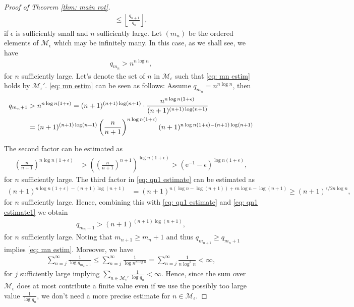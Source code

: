 \documentclass[11pt]{amsart}
\theoremstyle{definition}
\numberwithin{equation}{section}
\begin{document}
\begin{proof}[Proof of Theorem \ref{thm: main rot}]
\begin{align*}
 \leq  \left\lfloor \frac{q_{n+1}}{q_n}\right\rfloor, 
\end{align*}
if $\epsilon$ is sufficiently small and $n$ sufficiently large. 
Let $(m_n)$ be the ordered elements of $\mathcal{M}_{\epsilon}$ which may be infinitely many. In this case, as we shall see, we have
\begin{align}
 q_{m_n}> n^{n\log n},\label{eq: mn estim}
\end{align} 
for $n$ sufficiently large. Let's denote the set of $n$ in $\mathcal{M}_{\epsilon}$ such that \eqref{eq: mn estim} holds by $\mathcal{M}_{\epsilon}'$. \eqref{eq: mn estim} can be seen as follows: 
Assume $q_{m_n}=n^{n\log n}$, then 
\begin{align}
 q_{m_n+1} &> n^{n\log n(1+\epsilon)}
 = (n+1)^{(n+1)\log (n+1)}\cdot \frac{ n^{n\log n(1+\epsilon)}}{(n+1)^{(n+1)\log (n+1)}}\notag\\
 &=(n+1)^{(n+1)\log (n+1)}\left(\frac{n}{n+1}\right)^{n\log n(1+\epsilon)}
 (n+1)^{n\log n(1+\epsilon)- (n+1)\log (n+1)}\label{eq: qn1 estimate}
\end{align}

The second factor can be estimated as
\begin{align}
 \left(\frac{n}{n+1}\right)^{n\log n(1+\epsilon)}
 &>\left(\left(\frac{n}{n+1}\right)^{n+1}\right)^{\log n(1+\epsilon)}
 > \left(\mathrm{e}^{-1}-\epsilon\right)^{\log n(1+\epsilon)},\label{eq: qn1 estimate1} 
\end{align}
for $n$ sufficiently large. 
The third factor in \eqref{eq: qn1 estimate} can be estimated as 
\begin{align*}
 (n+1)^{n\log n(1+\epsilon)- (n+1)\log (n+1)}
 &=(n+1)^{n(\log n-\log (n+1))+\epsilon n\log n-\log (n+1)}
 \geq (n+1)^{\epsilon/2 n\log n}, 
\end{align*}
for $n$ sufficiently large. 
Hence, combining this with \eqref{eq: qn1 estimate} and \eqref{eq: qn1 estimate1} we obtain 
\begin{align*}
 q_{m_n+1}> (n+1)^{(n+1)\log (n+1)}, 
\end{align*}
for $n$ sufficiently large. Noting that $m_{n+1}\geq m_n+1$ and thus $q_{m_{n+1}}\geq q_{m_n+1}$ implies \eqref{eq: mn estim}. 
Moreover, we have 
\begin{align*}
 \sum_{n=j}^{\infty}\frac{1}{\log q_{m_n+1}}
 \leq \sum_{n=j}^{\infty}\frac{1}{\log n^{n\log n}}
 =\sum_{n=j}^{\infty}\frac{1}{ n\log^2 n}<\infty,
\end{align*}
for $j$ sufficiently large
implying
$\sum_{n\in \mathcal{M}_\epsilon'} \frac{1}{\log q_n}<\infty$.
Hence, since the sum over $\mathcal{M}_{\epsilon}$ does at most contribute a finite value even if we use the possibly too large value $\frac{1}{\log q_n}$, we don't need a more precise estimate for $n\in\mathcal{M}_{\epsilon}$. 


\end{proof}
\end{document}
